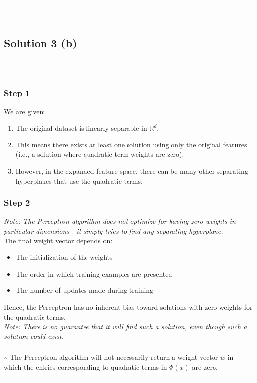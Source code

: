 \documentclass{article}
\begin{document}
\noindent\rule{\textwidth}{0.4pt}\\

\newpage

\subsection*{Solution 3 (b)}
\noindent\rule{\textwidth}{0.4pt}\\

\subsubsection*{Step 1}
\parbox{\textwidth}{
We are given:
\begin{enumerate}
\item The original dataset is linearly separable in $\mathbb{R}^d$.
\item This means there exists at least one solution using only the original features (i.e., a solution where quadratic term weights are zero).
\item However, in the expanded feature space, there can be many other separating hyperplanes that use the quadratic terms.
\end{enumerate}
}
\subsubsection*{Step 2}
\parbox{\textwidth}{
\textit{Note: The Perceptron algorithm does not optimize for having zero weights in particular dimensions—it simply tries to find any separating hyperplane.}\\

The final weight vector depends on:
\begin{itemize}
\item The initialization of the weights
\item The order in which training examples are presented
\item The number of updates made during training
\end{itemize}
Hence, the Perceptron has no inherent bias toward solutions with zero weights for the quadratic terms.\\

\textit{Note: There is no guarantee that it will find such a solution, even though such a solution could exist.}
}

\subsubsection*{\normalfont}{$\therefore$ The Perceptron algorithm will not necessarily return a weight vector $w$ in which the entries corresponding to quadratic terms in $\Phi(x)$ are zero.}

\noindent\rule{\textwidth}{0.4pt}\\
\end{document}
